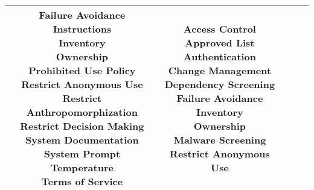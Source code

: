 \documentclass[fleqn]{article}
\begin{document}
\begin{landscape}
\begin{table}[H]
\begin{tabular}{|c|c|c|c|c|}
{			\textbullet\hspace{3pt} Failure Avoidance\\ 	
			\textbullet\hspace{3pt} Instructions\\ 	
			\textbullet\hspace{3pt} Inventory\\ 	
			\textbullet\hspace{3pt} Ownership\\ 	
			\textbullet\hspace{3pt} Prohibited Use Policy\\ 	
			\textbullet\hspace{3pt} Restrict Anonymous Use\\ 	
			\textbullet\hspace{3pt} Restrict Anthropomorphization \\ 				
			\textbullet\hspace{3pt} Restrict Decision Making\\ 				
			\textbullet\hspace{3pt} System Documentation\\ 	
			\textbullet\hspace{3pt} System Prompt\\ 	
			\textbullet\hspace{3pt} Temperature\\ 	
			\textbullet\hspace{3pt} Terms of Service \\
		}
		&
		\makecell[l]{
			\textbullet\hspace{3pt} Access Control\\ 	
			\textbullet\hspace{3pt} Approved List\\ 	
			\textbullet\hspace{3pt} Authentication\\ 	
			\textbullet\hspace{3pt} Change Management\\ 	
			\textbullet\hspace{3pt} Dependency Screening\\ 	
			\textbullet\hspace{3pt} Failure Avoidance\\ 	
			\textbullet\hspace{3pt} Inventory\\ 	
			\textbullet\hspace{3pt} Ownership\\  	
			\textbullet\hspace{3pt} Malware Screening\\ 
			\textbullet\hspace{3pt} Restrict Anonymous Use\\ 	
		}
		\\
		\hline
	\end{tabular}
	\label{table:low_risk_plan_by_tc_cont}
\end{table}

\end{landscape}
\pagebreak 
\end{document}
